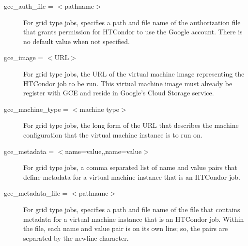 \begin{description}

\label{condor-submit-gce-auth-file}
\item[gce\_auth\_file = $<$pathname$>$]
For grid type  jobs, 
specifies a path and file name of the authorization file that grants
permission for HTCondor to use the Google account.
There is no default value when not specified.


\label{condor-submit-gce-image}
\item[gce\_image = $<$URL$>$]
For grid type  jobs,
the URL of the virtual machine image representing the HTCondor job to
be run.  This virtual machine image must already be register with GCE
and reside in Google's Cloud Storage service.


\label{condor-submit-gce-machine-type}
\item[gce\_machine\_type = $<$machine type$>$]
For grid type  jobs,
the long form of the URL that describes the machine configuration that the
virtual machine instance is to run on. 


\label{condor-submit-gce-metadata}
\item[gce\_metadata = $<$name=value,\Dots,name=value$>$]
For grid type  jobs,
a comma separated list of name and value pairs that define metadata
for a virtual machine instance that is an HTCondor job.


\label{condor-submit-gce-metadata-file}
\item[gce\_metadata\_file = $<$pathname$>$]
For grid type  jobs, 
specifies a path and file name of the file that contains metadata
for a virtual machine instance that is an HTCondor job.
Within the file, each name and value pair is on its own line;
so, the pairs are separated by the newline character.



\end{description}
